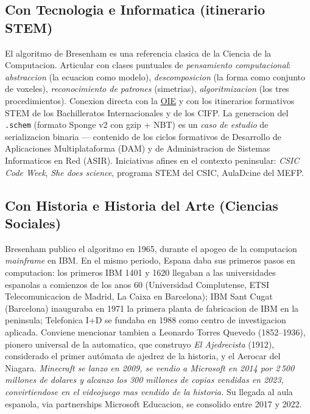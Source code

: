 \documentclass[12pt,a4paper]{scrartcl}
\begin{document}
\subsection{Con Tecnologia e Informatica (itinerario STEM)}
El algoritmo de Bresenham es una referencia clasica de la Ciencia de la Computacion. Articular con clases puntuales de \emph{pensamiento computacional}: \emph{abstraccion} (la ecuacion como modelo), \emph{descomposicion} (la forma como conjunto de voxeles), \emph{reconocimiento de patrones} (simetrias), \emph{algoritmizacion} (los tres procedimientos). Conexion directa con la \hyperref[sec:ome]{OIE} y con los itinerarios formativos STEM de los Bachilleratos Internacionales y de los CIFP. La generacion del \texttt{.schem} (formato Sponge v2 con gzip + NBT) es un \emph{caso de estudio} de serializacion binaria --- contenido de los ciclos formativos de Desarrollo de Aplicaciones Multiplataforma (DAM) y de Administracion de Sistemas Informaticos en Red (ASIR). Iniciativas afines en el contexto peninsular: \emph{CSIC Code Week}, \emph{She does science}, programa STEM del CSIC, AulaDcine del MEFP.

\subsection{Con Historia e Historia del Arte (Ciencias Sociales)}
Bresenham publico el algoritmo en 1965, durante el apogeo de la computacion \emph{mainframe} en IBM. En el mismo periodo, Espana daba sus primeros pasos en computacion: los primeros IBM 1401 y 1620 llegaban a las universidades espanolas a comienzos de los anos 60 (Universidad Complutense, ETSI Telecomunicacion de Madrid, La Caixa en Barcelona); IBM Sant Cugat (Barcelona) inauguraba en 1971 la primera planta de fabricacion de IBM en la peninsula; Telefonica I+D se fundaba en 1988 como centro de investigacion aplicada. Conviene mencionar tambien a Leonardo Torres Quevedo (1852--1936), pionero universal de la automatica, que construyo \emph{El Ajedrecista} (1912), considerado el primer aut\'omata de ajedrez de la historia, y el Aerocar del Niagara. \emph{Minecraft se lanzo en 2009, se vendio a Microsoft en 2014 por 2\,500 millones de dolares y alcanzo los 300 millones de copias vendidas en 2023, convirtiendose en el videojuego mas vendido de la historia.} Su llegada al aula espanola, via partnerships Microsoft Educacion, se consolido entre 2017 y 2022.
\end{document}
